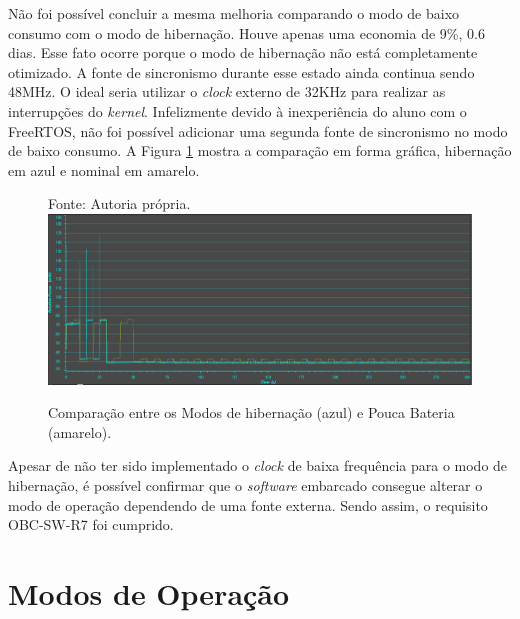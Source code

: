 Não foi possível concluir a mesma melhoria comparando o modo de baixo consumo com o modo de hibernação. Houve apenas uma economia de 9\%, 0.6 dias. Esse fato ocorre porque o modo de hibernação não está completamente otimizado. A fonte de sincronismo durante esse estado ainda continua sendo 48MHz. O ideal seria utilizar o \textit{clock} externo de 32KHz para realizar as interrupções do \textit{kernel}. Infelizmente devido à inexperiência do aluno com o FreeRTOS, não foi possível adicionar uma segunda fonte de sincronismo no modo de baixo consumo. A Figura \ref{hibernatexLBM} mostra a comparação em forma gráfica, hibernação em azul e nominal em amarelo.

\begin{figure}[h]
\footnotesize{	
	\centering
			\centering
	\footnotesize{Fonte: Autoria própria.}
	\includegraphics[keepaspectratio=true,scale=0.470]{figuras/hibernatexLBM.PNG}
	\caption{Comparação entre os Modos de hibernação (azul) e Pouca Bateria (amarelo).}
	\label{hibernatexLBM}
}
\end{figure}
\FloatBarrier

Apesar de não ter sido implementado o \textit{clock} de baixa frequência para o modo de hibernação, é possível confirmar que o \textit{software} embarcado consegue alterar o modo de operação dependendo de uma fonte externa. Sendo assim, o requisito OBC-SW-R7 foi cumprido.

\section{Modos de Operação}



